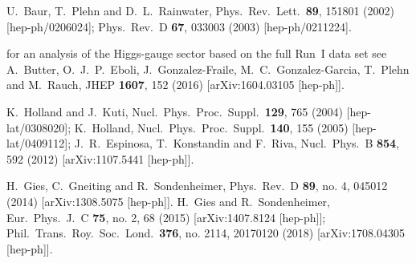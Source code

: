 \documentclass[aps,prd,11pt,tightenlines,superscriptaddress,nofootinbib,preprintnumbers,notitlepage]{revtex4-1}
\begin{document}
\begin{thebibliography}{99}
  U.~Baur, T.~Plehn and D.~L.~Rainwater,
  Phys.\ Rev.\ Lett.\  {\bf 89}, 151801 (2002)
  [hep-ph/0206024];
  Phys.\ Rev.\ D {\bf 67}, 033003 (2003)
  [hep-ph/0211224].

  for an analysis of the Higgs-gauge sector based on the full Run~I data set see 
  A.~Butter, O.~J.~P.~Eboli, J.~Gonzalez-Fraile, M.~C.~Gonzalez-Garcia, T.~Plehn and M.~Rauch,
  JHEP {\bf 1607}, 152 (2016)
  [arXiv:1604.03105 [hep-ph]].

  K.~Holland and J.~Kuti,
  Nucl.\ Phys.\ Proc.\ Suppl.\  {\bf 129}, 765 (2004)
  [hep-lat/0308020];
  K.~Holland,
  Nucl.\ Phys.\ Proc.\ Suppl.\  {\bf 140}, 155 (2005)
  [hep-lat/0409112];
  J.~R.~Espinosa, T.~Konstandin and F.~Riva,
  Nucl.\ Phys.\ B {\bf 854}, 592 (2012)
  [arXiv:1107.5441 [hep-ph]].

  H.~Gies, C.~Gneiting and R.~Sondenheimer,
  Phys.\ Rev.\ D {\bf 89}, no. 4, 045012 (2014)
  [arXiv:1308.5075 [hep-ph]].
  H.~Gies and R.~Sondenheimer,
  Eur.\ Phys.\ J.\ C {\bf 75}, no. 2, 68 (2015)
  [arXiv:1407.8124 [hep-ph]]; 
  Phil.\ Trans.\ Roy.\ Soc.\ Lond.\  {\bf 376}, no. 2114, 20170120 (2018)
  [arXiv:1708.04305 [hep-ph]].


\end{thebibliography}
\end{document}
